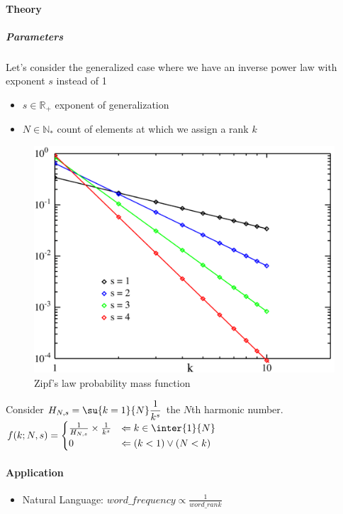 \paragraph{Theory}
\subparagraph{Parameters}
Let's consider the generalized case where we have an inverse power law with exponent $s$ instead of 1
\begin{itemize}
    \item $s\in\mathbb{R}_{+}$ exponent of generalization
    \item $N\in\mathbb{N}_{*}$ count of elements at which we assign a rank $k$
\end{itemize}
\begin{figure}[H]
    \begin{center}
        \includegraphics[width=.5\textwidth]{./chapters/2_statistics/02_common_probability_distributions/images/05_zipf_pmf.png}
    \end{center}
    \caption{Zipf's law probability mass function}
    \label{fig:05_zipf_pmf}
\end{figure}
Consider $H_{N,s} = \su{k=1}{N}\dfrac{1}{k^{s}}$ the $N$th harmonic number.\\
$f(k; N, s) = 
\begin{cases}
    \frac{1}{H_{N,s}}\times\frac{1}{k^{s}} &\Leftarrow k\in\inter{1}{N}\\
    0 &\Leftarrow (k < 1)\vee (N < k)
\end{cases}
$

\paragraph{Application}
\begin{itemize}
    \item Natural Language: $word\_frequency \propto \frac{1}{word\_rank}$
\end{itemize}

